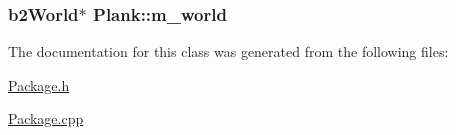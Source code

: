 \hypertarget{classPlank_a13c403210d33ed7d7183cfd6dd71b494}{
\subsubsection[{m\-\_\-world}]{\setlength{\rightskip}{0pt plus 5cm}b2\-World$\ast$ Plank\-::m\-\_\-world\hspace{0.3cm}{\ttfamily [private]}}}\label{classPlank_a13c403210d33ed7d7183cfd6dd71b494}


The documentation for this class was generated from the following files\-:\begin{DoxyCompactItemize}
\item 
\hyperlink{Package_8h}{Package.\-h}\item 
\hyperlink{Package_8cpp}{Package.\-cpp}\end{DoxyCompactItemize}

